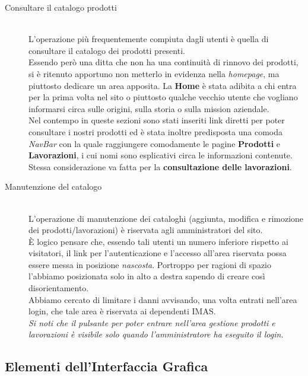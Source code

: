 \documentclass[11pt]{article}
\begin{document}
\begin{description}
	\item [Consultare il catalogo prodotti] \hfill \\
	L'operazione più frequentemente compiuta dagli utenti è quella di consultare il catalogo dei prodotti presenti.
	\\
	Essendo però una ditta che non ha una continuità di rinnovo dei prodotti, si è ritenuto apportuno non metterlo in evidenza nella \textit{homepage}, ma piuttosto  dedicare un area apposita. 
	La \textbf{Home} è stata adibita a chi entra per la prima volta nel sito o piuttosto qualche vecchio utente che vogliano informarsi circa sulle origini, sulla storia o sulla mission aziendale. \\
	Nel contempo in queste sezioni sono stati inseriti link diretti per poter consultare i nostri prodotti  ed è stata inoltre predisposta una comoda \textit{NavBar} con la quale raggiungere comodamente le pagine \textbf{Prodotti} e \textbf{Lavorazioni}, i cui nomi sono esplicativi circa le informazioni contenute.
	Stessa considerazione va fatta per la \textbf{consultazione delle lavorazioni}.

	\item [Manutenzione del catalogo] \hfill \\
	L'operazione di manutenzione dei cataloghi (aggiunta, modifica e rimozione dei prodotti/lavorazioni) è riservata agli amministratori del sito.\\
	 È logico pensare che, essendo tali utenti un numero inferiore rispetto ai visitatori, il link per l'autenticazione e l'accesso all'area riservata possa essere messa in posizione \textit{nascosta}. Portroppo per ragioni di spazio l'abbiamo posizionata solo in alto a destra sapendo di creare così disorientamento.\\
	 Abbiamo cercato di limitare i danni avvisando,  una volta entrati nell'area login, che tale area è riservata ai dependenti IMAS.\\
	  \textit{Si noti che il pulsante per poter entrare nell'area gestione prodotti e lavorazioni è visibile solo quando  l'amministratore ha eseguito il login.}
\end{description}
\subsection{Elementi dell'Interfaccia Grafica}
\end{document}
